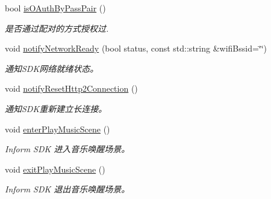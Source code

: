 \begin{DoxyCompactItemize}
\mbox{\label{classduerOSDcsSDK_1_1sdkInterfaces_1_1DcsSdk_a9948aeb54a57527eb7757ac23ca65dd6}} 
bool \hyperlink{classduerOSDcsSDK_1_1sdkInterfaces_1_1DcsSdk_a9948aeb54a57527eb7757ac23ca65dd6}{is\+O\+Auth\+By\+Pass\+Pair} ()
\begin{DoxyCompactList}\small\item\em 是否通过配对的方式授权过. \end{DoxyCompactList}\item 
void \hyperlink{classduerOSDcsSDK_1_1sdkInterfaces_1_1DcsSdk_adf2f5c84aeb4651675b4480204fd36c2}{notify\+Network\+Ready} (bool status, const std\+::string \&wifi\+Bssid=\char`\"{}\char`\"{})
\begin{DoxyCompactList}\small\item\em 通知\+S\+D\+K网络就绪状态。 \end{DoxyCompactList}\item 
\mbox{\label{classduerOSDcsSDK_1_1sdkInterfaces_1_1DcsSdk_a9cb59ac83a2b53504384725ecec1df0a}} 
void \hyperlink{classduerOSDcsSDK_1_1sdkInterfaces_1_1DcsSdk_a9cb59ac83a2b53504384725ecec1df0a}{notify\+Reset\+Http2\+Connection} ()
\begin{DoxyCompactList}\small\item\em 通知\+S\+D\+K重新建立长连接。 \end{DoxyCompactList}\item 
\mbox{\label{classduerOSDcsSDK_1_1sdkInterfaces_1_1DcsSdk_afcd69e9c352d50a969d3951da0fe047f}} 
void \hyperlink{classduerOSDcsSDK_1_1sdkInterfaces_1_1DcsSdk_afcd69e9c352d50a969d3951da0fe047f}{enter\+Play\+Music\+Scene} ()
\begin{DoxyCompactList}\small\item\em Inform S\+DK 进入音乐唤醒场景。 \end{DoxyCompactList}\item 
\mbox{\label{classduerOSDcsSDK_1_1sdkInterfaces_1_1DcsSdk_a2d509bd1f83cf770622fd3bd5d8ee2bf}} 
void \hyperlink{classduerOSDcsSDK_1_1sdkInterfaces_1_1DcsSdk_a2d509bd1f83cf770622fd3bd5d8ee2bf}{exit\+Play\+Music\+Scene} ()
\begin{DoxyCompactList}\small\item\em Inform S\+DK 退出音乐唤醒场景。 \end{DoxyCompactList}\item 

\end{DoxyCompactItemize}
